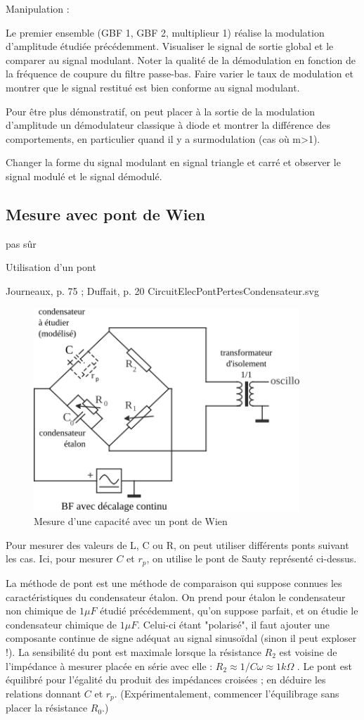 \documentclass{article}%
\begin{document}
Manipulation :

    Le premier ensemble (GBF 1, GBF 2, multiplieur 1) réalise la modulation d'amplitude étudiée précédemment.
    Visualiser le signal de sortie global et le comparer au signal modulant. Noter la qualité de la démodulation en fonction de la fréquence de coupure du filtre passe-bas.
    Faire varier le taux de modulation et montrer que le signal restitué est bien conforme au signal modulant.

Pour être plus démonstratif, on peut placer à la sortie de la modulation d'amplitude un démodulateur classique à diode et montrer la différence des comportements, en particulier quand il y a surmodulation (cas où m>1).

    Changer la forme du signal modulant en signal triangle et carré et observer le signal modulé et le signal démodulé.

\subsection{Mesure avec pont de Wien}
pas sûr

Utilisation d'un pont

Journeaux, p. 75 ; Duffait, p. 20
CircuitElecPontPertesCondensateur.svg
\begin{figure}
	\centerline{\includegraphics[width=10cm]{images-exp/CircuitElecPontPertesCondensateur.png}}
	\caption{Mesure d'une capacité avec un pont de Wien}
\end{figure}

Pour mesurer des valeurs de L, C ou R, on peut utiliser différents ponts suivant les cas. Ici, pour mesurer $C$ et $r_{p}$, on utilise le pont de Sauty représenté ci-dessus.

La méthode de pont est une méthode de comparaison qui suppose connues les caractéristiques du condensateur étalon. On prend pour étalon le condensateur non chimique de $1 \mu F$ étudié précédemment, qu'on suppose parfait, et on étudie le condensateur chimique de $1\mu  F$. Celui-ci étant "polarisé", il faut ajouter une composante continue de signe adéquat au signal sinusoïdal (sinon il peut exploser !). La sensibilité du pont est maximale lorsque la résistance $R_{2}$ est voisine de l'impédance à mesurer placée en série avec elle : $R_{2} \approx 1 / C\omega \approx 1 k\Omega$ . Le pont est équilibré pour l'égalité du produit des impédances croisées ; en déduire les relations donnant $C$ et $r_{p}$. (Expérimentalement, commencer l'équilibrage sans placer la résistance $R_{0}$.) 
\end{document}

